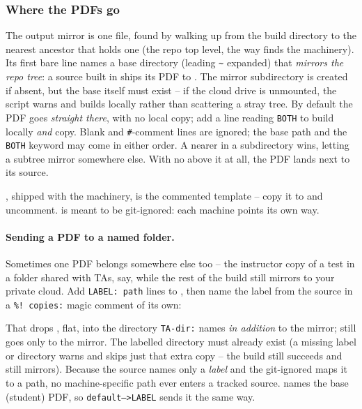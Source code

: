 \subsubsection{Where the PDFs go}

The output mirror is one  file, found by walking up from the
build directory to the nearest ancestor that holds one (the repo top level,
the way  finds the machinery). Its first bare line names a
base directory (leading \texttt{\~{}} expanded) that \emph{mirrors the repo
tree}: a source built in  ships its PDF to
. The mirror subdirectory is created if absent,
but the base itself must exist -- if the cloud drive is unmounted, the script
warns and builds locally rather than scattering a stray tree. By default the
PDF goes \emph{straight there}, with no local copy; add a line reading
\texttt{BOTH} to build locally \emph{and} copy. Blank and \texttt{\#}-comment
lines are ignored; the base path and the \texttt{BOTH} keyword may come in
either order. A nearer  in a subdirectory wins, letting a
subtree mirror somewhere else. With no  above it at all, the PDF
lands next to its source.

, shipped with the machinery, is the commented template --
copy it to  and uncomment.  is meant to be
git-ignored: each machine points its own way.

\paragraph{Sending a PDF to a named folder.}
Sometimes one PDF belongs somewhere else too -- the instructor copy of a test in
a folder shared with TAs, say, while the rest of the build still mirrors to your
private cloud. Add \texttt{LABEL: path} lines to , then name the
label from the source in a \texttt{\%! copies:} magic comment of its own:

\begin{manexsource}
\end{manexsource}

\noindent That drops , flat, into the directory
\texttt{TA-dir:} names \emph{in addition} to the mirror;  still
goes only to the mirror. The labelled directory must already exist (a missing
label or directory warns and skips just that extra copy -- the build still
succeeds and still mirrors). Because the source names only a \emph{label} and
the git-ignored  maps it to a path, no machine-specific path
ever enters a tracked source.  names the base (student) PDF, so
\texttt{default-->LABEL} sends it the same way.

